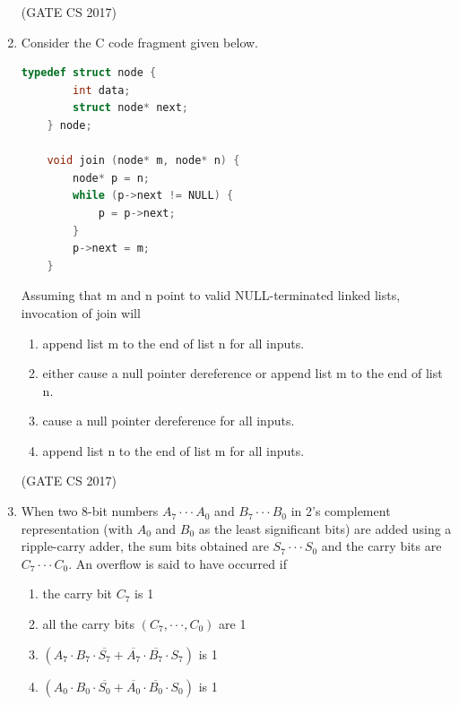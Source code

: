 \documentclass[a4paper, 11pt]{article}
\begin{document}
\begin{enumerate}
    \hfill (GATE CS 2017)
    
    \item Consider the C code fragment given below.
    
    \begin{lstlisting}[language=C]
    typedef struct node {
        int data;
        struct node* next;
    } node;
    
    void join (node* m, node* n) {
        node* p = n;
        while (p->next != NULL) {
            p = p->next;
        }
        p->next = m;
    }
    \end{lstlisting}
    
    Assuming that m and n point to valid NULL-terminated linked lists, invocation of join will
    
    \begin{enumerate}
        \item append list m to the end of list n for all inputs.
        \item either cause a null pointer dereference or append list m to the end of list n.
        \item cause a null pointer dereference for all inputs.
        \item append list n to the end of list m for all inputs.
    \end{enumerate}
    
    \hfill (GATE CS 2017)
    
    \item When two 8-bit numbers $A_{7}\cdot\cdot\cdot A_{0}$ and $B_{7}\cdot\cdot\cdot B_{0}$ in 2's complement representation (with $A_{0}$ and $B_{0}$ as the least significant bits) are added using a ripple-carry adder, the sum bits obtained are $S_{7}\cdot\cdot\cdot S_{0}$ and the carry bits are $C_{7}\cdot\cdot\cdot C_{0}$. An overflow is said to have occurred if
    
    \begin{enumerate}
        \item the carry bit $C_{7}$ is 1
        \item all the carry bits $(C_{7},\cdot\cdot\cdot,C_{0})$ are 1
        \item $(A_{7}\cdot B_{7}\cdot\overline{S_{7}}+\overline{A_{7}}\cdot\overline{B_{7}}\cdot S_{7})$ is 1
        \item $(A_{0}\cdot B_{0}\cdot\overline{S_{0}}+\overline{A_{0}}\cdot\overline{B_{0}}\cdot S_{0})$ is 1
    \end{enumerate}
    

\end{enumerate}
\end{document}
